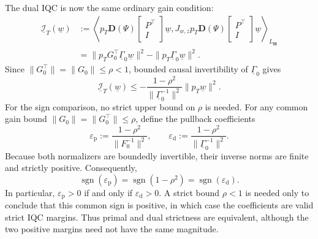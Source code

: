 \documentclass[11pt]{article}
\newcommand{\bmat}[1]{\begin{bmatrix}#1\end{bmatrix}}
\newcommand{\ip}[2]{\left\langle #1,#2\right\rangle}
\begin{document}
The dual IQC is now the same ordinary gain condition:
\begin{align*}
 \underline{\mathcal I}_T(\underline w)
 &:={}
 \ip{p_T\mathbf D(\Psi)\bmat{P^\top\\I}\underline w}
 {J_{w,z}p_T\mathbf D(\Psi)\bmat{P^\top\\I}\underline w}_{L_\mathbf H}\\
 &=\|p_TG_0^\top\underline\Gamma_0\underline w\|^2
   -\|p_T\underline\Gamma_0\underline w\|^2.
\end{align*}
Since $\|G_0^\top\|=\|G_0\|\leq\rho<1$, bounded causal invertibility of
$\underline\Gamma_0$ gives
\begin{equation*}
 \underline{\mathcal I}_T(\underline w)
 \leq-\frac{1-\rho^2}{\|\underline\Gamma_0^{-1}\|^2}
       \|p_T\underline w\|^2.
\end{equation*}
For the sign comparison, no strict upper bound on $\rho$ is needed.  For any
common gain bound $\|G_0\|=\|G_0^\top\|\leq\rho$, define the pullback
coefficients
\begin{equation*}
 \varepsilon_{\mathrm p}:=
 \frac{1-\rho^2}{\|F_0^{-1}\|^2},
 \qquad
 \varepsilon_{\mathrm d}:=
 \frac{1-\rho^2}{\|\underline\Gamma_0^{-1}\|^2}.
\end{equation*}
Because both normalizers are boundedly invertible, their inverse norms are
finite and strictly positive.  Consequently,
\begin{equation*}
 \operatorname{sgn}(\varepsilon_{\mathrm p})
 =\operatorname{sgn}(1-\rho^2)
 =\operatorname{sgn}(\varepsilon_{\mathrm d}).
\end{equation*}
In particular, $\varepsilon_{\mathrm p}>0$ if and only if
$\varepsilon_{\mathrm d}>0$.  A strict bound $\rho<1$ is needed only to
conclude that this common sign is positive, in which case the coefficients are
valid strict IQC margins.  Thus primal and dual strictness are equivalent,
although the two positive margins need not have the same magnitude.
\end{document}
